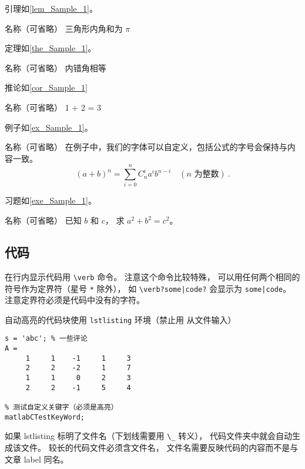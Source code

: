 引理如\autoref{lem_Sample_1}。
\begin{lemma}{名称（可省略）}\label{lem_Sample_1}
三角形内角和为 $\pi$
\end{lemma}

定理如\autoref{the_Sample_1}。
\begin{theorem}{名称（可省略）}\label{the_Sample_1}
内错角相等
\end{theorem}

推论如\autoref{cor_Sample_1}
\begin{corollary}{名称（可省略）}\label{cor_Sample_1}
1 + 2 = 3
\end{corollary}

例子如\autoref{ex_Sample_1}。 
\begin{example}{名称（可省略）}\label{ex_Sample_1}
在例子中，我们的字体可以自定义，包括公式的字号会保持与内容一致。
\begin{equation}
(a+b)^n = \sum_{i=0}^n C_n^i a^i b^{n-i} \quad (\text{$n$ 为整数})~.
\end{equation}
\end{example}

习题如\autoref{exe_Sample_1}。 
\begin{exercise}{名称（可省略）}\label{exe_Sample_1}
已知 $b$ 和 $c$， 求 $a^2 + b^2 = c^2$。
\end{exercise}

\subsection{代码}
在行内显示代码用 \verb`\verb` 命令。 注意这个命令比较特殊， 可以用任何两个相同的符号作为定界符（星号 \verb`*` 除外）， 如 \verb`\verb?some|code?` 会显示为 \verb?some|code?。 注意定界符必须是代码中没有的字符。

自动高亮的代码块使用 \verb`lstlisting` 环境（禁止用 \verb`` 从文件输入）
\begin{lstlisting}[language=matlabC]
s = 'abc'; % 一些评论
A =
     1     1    -1     1     3
     2     2    -2     1     7
     1     1     0     2     3
     2     2    -1     5     4

% 测试自定义关键字（必须是高亮）
matlabCTestKeyWord;
\end{lstlisting}

如果 lstlisting 标明了文件名（下划线需要用 \verb`\_` 转义）， 代码文件夹中就会自动生成该文件。 较长的代码文件必须含文件名， 文件名需要反映代码的内容而不是与文章 label 同名。

